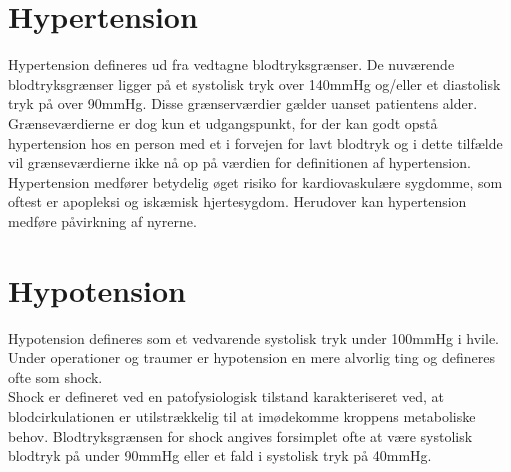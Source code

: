\section{Hypertension}
Hypertension defineres ud fra vedtagne blodtryksgrænser. De nuværende blodtryksgrænser ligger på et systolisk tryk over 140mmHg og/eller et diastolisk tryk på over 90mmHg. Disse grænserværdier gælder uanset patientens alder. Grænseværdierne er dog kun et udgangspunkt, for der kan godt opstå hypertension hos en person med et i forvejen for lavt blodtryk og i dette tilfælde vil grænseværdierne ikke nå op på værdien for definitionen af hypertension.\\
Hypertension medfører betydelig øget risiko for kardiovaskulære sygdomme, som oftest er apopleksi og iskæmisk hjertesygdom. Herudover kan hypertension medføre påvirkning af nyrerne.\cite{Hypertension}

\section{Hypotension}
Hypotension defineres som et vedvarende systolisk tryk under 100mmHg i hvile. \\
Under operationer og traumer er hypotension en mere alvorlig ting og defineres ofte som shock.\\
Shock er defineret ved en patofysiologisk tilstand karakteriseret ved, at blodcirkulationen er utilstrækkelig til at imødekomme kroppens metaboliske behov. Blodtryksgrænsen for shock angives forsimplet ofte at være systolisk blodtryk på under 90mmHg eller et fald i systolisk tryk på 40mmHg.
\cite{Hypotension}

